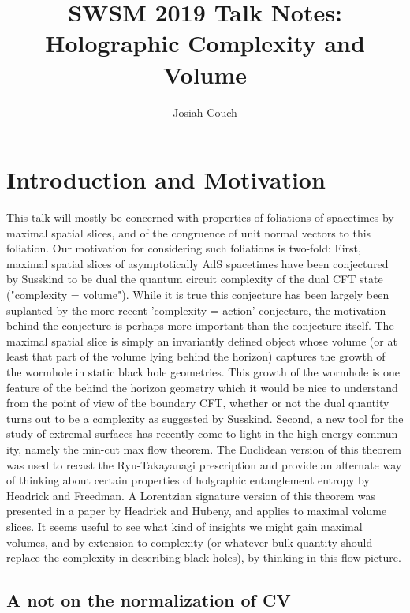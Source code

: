 \documentclass[12pt]{amsart}
\begin{document}
\title{SWSM 2019 Talk Notes: Holographic Complexity and Volume}
\author{Josiah Couch}

\maketitle

\section{Introduction and Motivation}

This talk will mostly be concerned with properties of foliations of spacetimes by maximal spatial slices, and of the congruence of unit normal vectors to this foliation. Our motivation for considering such foliations is two-fold: First, maximal spatial slices of asymptotically AdS spacetimes have been conjectured by Susskind to be dual the quantum circuit complexity of the dual CFT state ("complexity = volume"). While it is true this conjecture has been largely been suplanted by the more recent 'complexity = action' conjecture, the motivation behind the conjecture is perhaps more important than the conjecture itself. The maximal spatial slice is simply an invariantly defined object whose volume (or at least that part of the volume lying behind the horizon) captures the growth of the wormhole in static black hole geometries. This growth of the wormhole is one feature of the behind the horizon geometry which it would be nice to understand from the point of view of the boundary CFT, whether or not the dual quantity turns out to be a complexity as suggested by Susskind. Second, a new tool for the study of extremal surfaces has recently come to light in the high energy commun ity, namely the min-cut max flow theorem. The Euclidean version of this theorem was used to recast the Ryu-Takayanagi prescription and provide an alternate way of thinking about certain properties of holgraphic entanglement entropy by Headrick and Freedman. A Lorentzian signature version of this theorem was presented in a paper by Headrick and Hubeny, and applies to maximal volume slices. It seems useful to see what kind of insights we might gain maximal volumes, and by extension to complexity (or whatever bulk quantity should replace the complexity in describing black holes), by thinking in this flow picture.

\subsection{A not on the normalization of CV}
\end{document}
